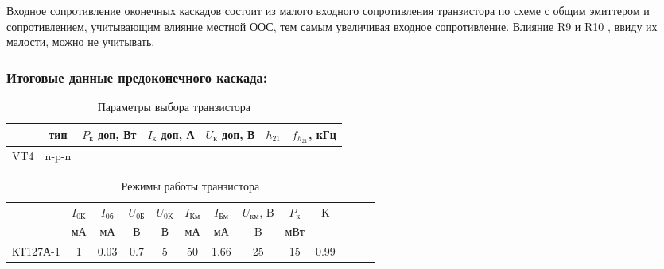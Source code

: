 Входное сопротивление оконечных каскадов состоит из малого входного сопротивления транзистора по схеме с общим эмиттером и сопротивлением, учитывающим влияние местной ООС, тем самым увеличивая входное сопротивление.  Влияние R9 и R10 , ввиду их малости, можно не учитывать. \par

\subsubsection{Итоговые данные предоконечного каскада:}

\begin{table}[htbp]
\caption{Параметры выбора транзистора}
\begin{center}\begin{tabular}{|c|c|c|c|c|c|c|}
\hline 
  & тип & $P_{\text{к}}$ доп, Вт & $I_{\text{к}}$ доп, А & $U_{\text{к}}$ доп, В & $h_{21}$ &  $f_{h_{21}}$, кГц \\ 
\hline 
VT4 & n-p-n &   &  &  &  & \\ 
\hline 
\end{tabular} 
\end{center}
\end{table}

\begin{table}[htbp]
\caption{Режимы работы транзистора}
\begin{center}\begin{tabular}{|c|c|c|c|c|c|c|c|c|c|c|c|c|}
\hline 
   & $I_\text{0К}$ & $I_\text{0б}$& $U_\text{0Б}$ & $U_\text{0К}$&  $I_{\text{Км}}$  & $I_{\text{Бм}}$& $U_{\text{км}}$, B & $P_{\text{к}}$ & K\\ 
  & мА & мА& В & В & мА & мА & B & мВт & \\
\hline 
КТ127А-1 & 1 & 0.03 & 0.7 & 5 & 50 & 1.66 & 25 & 15 & 0.99 \\
\hline
\end{tabular} 
\end{center}
\end{table}